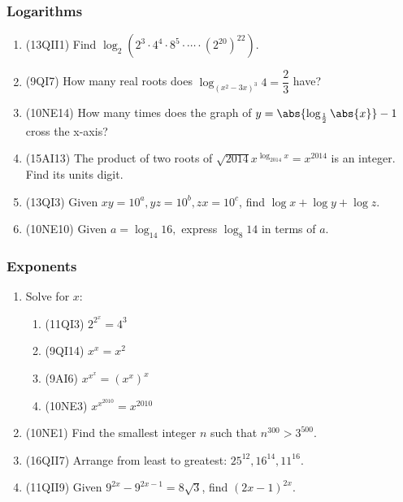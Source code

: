 \documentclass[10pt,paper=letter]{scrartcl}
\begin{document}
\subsubsection*{Logarithms}

\begin{enumerate}

\item (13QII1) Find $\log_2 \left(2^3 \cdot 4^4 \cdot 8^5 \cdot \cdots \cdot (2^{20})^{22} \right)$.

\item (9QI7) How many real roots does $\log_{(x^2-3x)^3}4 = \dfrac{2}{3}$ have?

\item (10NE14) How many times does the graph of $y = \abs{\log_{\frac{1}{2}} \abs{x}}-1$ cross the x-axis?


\item (15AI13) The product of two roots of $\sqrt{2014}x^{\log_{2014} x} = x^{2014}$ is an integer. Find its units digit.

\item (13QI3) Given $xy = 10^a, yz = 10^b, zx = 10^c$, find $\log x + \log y + \log z$.

\item (10NE10) Given $a = \log_{14} 16,$ express $\log_8 14$ in terms of $a$.

\end{enumerate}

\subsubsection*{Exponents}

\begin{enumerate}

\item Solve for $x$:

\begin{enumerate}

\item (11QI3) $2^{2^x} = 4^3$

\item (9QI14) $x^x = x^2$

\item (9AI6) $x^{x^x} = (x^x)^x$

\item (10NE3) $x^{x^{2010}} = x^{2010}$

\end{enumerate}

\item (10NE1) Find the smallest integer $n$ such that $n^{300} > 3^{500}.$

\item (16QII7) Arrange from least to greatest: $25^{12}, 16^{14}, 11^{16}$.

\item (11QII9) Given $9^{2x} - 9^{2x - 1} = 8\sqrt{3}$, find $(2x - 1)^{2x}$.

\end{enumerate}
\end{document}
